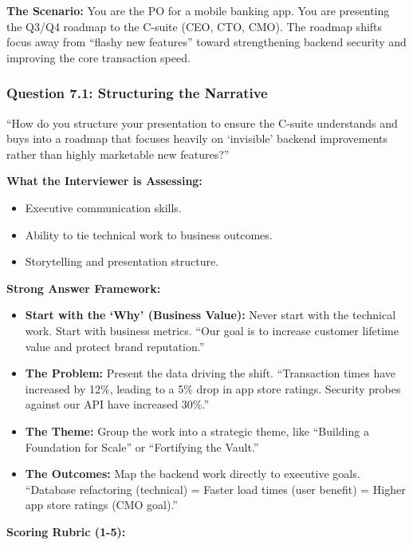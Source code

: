 \textbf{The Scenario:} You are the PO for a mobile banking app. You are
presenting the Q3/Q4 roadmap to the C-suite (CEO, CTO, CMO). The roadmap
shifts focus away from ``flashy new features'' toward strengthening
backend security and improving the core transaction speed.

\subsubsection{Question 7.1: Structuring the
Narrative}\label{question-7.1-structuring-the-narrative}

``How do you structure your presentation to ensure the C-suite
understands and buys into a roadmap that focuses heavily on `invisible'
backend improvements rather than highly marketable new features?''

\textbf{What the Interviewer is Assessing:}

\begin{itemize}
\tightlist
\item
  Executive communication skills.
\item
  Ability to tie technical work to business outcomes.
\item
  Storytelling and presentation structure.
\end{itemize}

\textbf{Strong Answer Framework:}

\begin{itemize}
\tightlist
\item
  \textbf{Start with the `Why' (Business Value):} Never start with the
  technical work. Start with business metrics. ``Our goal is to increase
  customer lifetime value and protect brand reputation.''
\item
  \textbf{The Problem:} Present the data driving the shift.
  ``Transaction times have increased by 12\%, leading to a 5\% drop in
  app store ratings. Security probes against our API have increased
  30\%.''
\item
  \textbf{The Theme:} Group the work into a strategic theme, like
  ``Building a Foundation for Scale'' or ``Fortifying the Vault.''
\item
  \textbf{The Outcomes:} Map the backend work directly to executive
  goals. ``Database refactoring (technical) = Faster load times (user
  benefit) = Higher app store ratings (CMO goal).''
\end{itemize}

\textbf{Scoring Rubric (1-5):}

